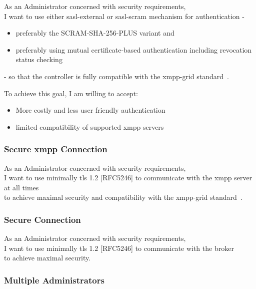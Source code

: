 As an Administrator concerned with security requirements,\\
I want to use either \gls{sasl-external} or \gls{sasl-scram} mechanism for authentication -

\begin{itemize}
    \item preferably the SCRAM-SHA-256-PLUS variant and
    \item preferably using mutual certificate-based authentication including revocation status checking
\end{itemize}

\noindent - so that the controller is fully compatible with the \gls{xmpp-grid} standard~\cite{ietf-mile-xmpp-grid-05}.

\noindent To achieve this goal, I am willing to accept:
\begin{itemize}
    \item More costly and less user friendly authentication
    \item limited compatibility of supported \gls{xmpp} servers
\end{itemize}

\subsubsection{Secure \gls{xmpp} Connection}

As an Administrator concerned with security requirements,\\
I want to use minimally \gls{tls} 1.2 [RFC5246] to communicate with the \gls{xmpp} server at all times\\
to achieve maximal security and compatibility with the \gls{xmpp-grid} standard~\cite{ietf-mile-xmpp-grid-05}.

\subsubsection{Secure Connection}

As an Administrator concerned with security requirements,\\
I want to use minimally \gls{tls} 1.2 [RFC5246] to communicate with the \gls{broker}\\
to achieve maximal security.

\subsubsection{Multiple Administrators}\label{sec:requirement-multiple-administrators}

